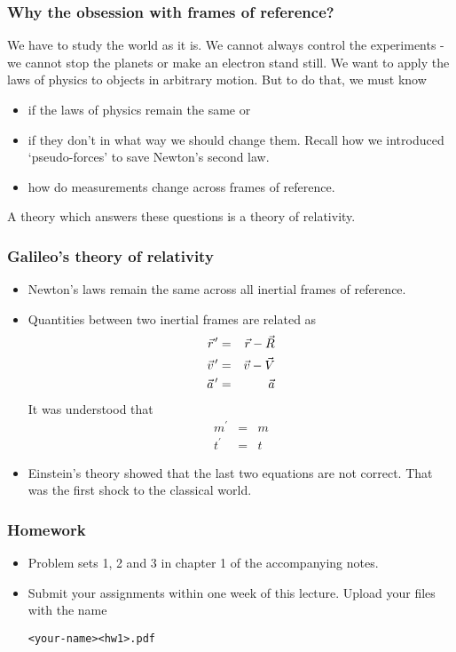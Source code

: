 \documentclass{beamer}
\newcommand{\pvec}[1]{\vec{#1}\mkern2mu\vphantom{#1}}
\begin{document}
\begin{frame}
\frametitle{Why the obsession with frames of reference?}
We have to study the world as it is. We cannot always control the experiments -
we cannot stop the planets or make an electron stand still. We want to apply
the laws of physics to objects in arbitrary motion. But to do that, we must 
know 
\begin{itemize}
\item if the laws of physics remain the same or
\item if they don't in what way we should change them. Recall how we introduced
`pseudo-forces' to save Newton's second law.
\item how do measurements change across frames of reference. 
\end{itemize}
A theory which answers these questions is a theory of relativity.
\end{frame}

\begin{frame}
\frametitle{Galileo's theory of relativity}
\begin{itemize}
\item Newton's laws remain the same across all inertial frames of reference.
\item Quantities between two inertial frames are related as
\begin{eqnarray}
\pvec{r}^\prime &=& \vec{r} - \vec{R} \label{4} \\
\pvec{v}^\prime &=& \vec{v} - \vec{V} \label{5} \\
\pvec{a}^\prime &=& \vec{a}           \label{6} 
\end{eqnarray}
It was understood that 
\begin{eqnarray}
m^\prime &=& m \label{e7} \\
t^\prime &=& t \label{e8}
\end{eqnarray}
\item Einstein's theory showed that the last two equations are not correct. 
That was the first shock to the classical world.
\end{itemize}
\end{frame}

\begin{frame}[fragile]
\frametitle{Homework}
\begin{itemize}
\item Problem sets 1, 2 and 3 in chapter 1 of the accompanying notes.
\item Submit your assignments within one week of this lecture. Upload your 
files with the name \begin{verbatim}<your-name><hw1>.pdf\end{verbatim}
\end{itemize}
\end{frame}
\end{document}
